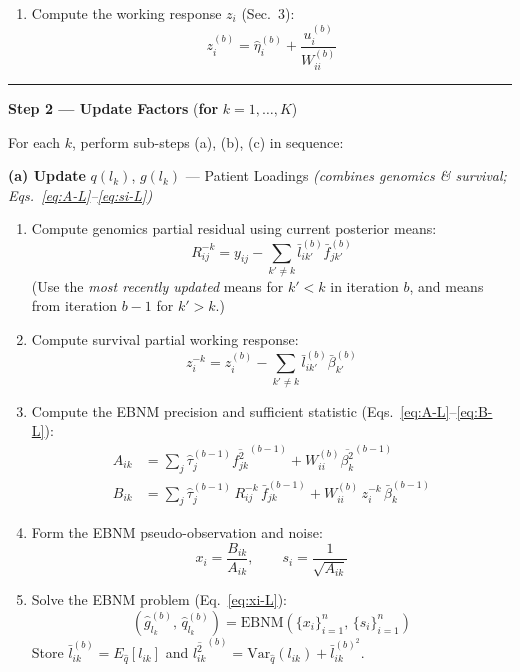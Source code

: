\documentclass{article}[12pt]
\newcommand{\lbar}[2]{\bar{l}_{#1#2}}
\newcommand{\fbar}[2]{\bar{f}_{#1#2}}
\newcommand{\bbar}[1]{\bar{\beta}_{#1}}
\newcommand{\lsec}[2]{\overline{l^{2}_{#1#2}}}
\newcommand{\fsec}[2]{\overline{f^{2}_{#1#2}}}
\newcommand{\bsec}[1]{\overline{\beta^{2}_{#1}}}
\begin{document}
\begin{tcolorbox}[
  breakable,
  colback=gray!4!white, colframe=black!70,
  title={\textbf{Algorithm 1.} Supervised MF --- CAVI Update Procedure},
  fonttitle=\bfseries, left=6pt, right=6pt, top=6pt, bottom=6pt
]
\begin{enumerate}[label=\textbf{1.\arabic*.}, leftmargin=2cm]
    \item Compute the working response $z_i$ (Sec.~3):
    \[
        z_i^{(b)} = \hat{\eta}_i^{(b)} + \frac{u_i^{(b)}}{W_{ii}^{(b)}}
    \]
\end{enumerate}

\medskip
\hrule
\medskip

\textbf{Step 2 --- Update Factors} \quad(\textbf{for} $k = 1, \ldots, K$)

\medskip
\noindent
For each $k$, perform sub-steps (a), (b), (c) in sequence:

\medskip
\textbf{(a) Update} $q(l_k)$, $g(l_k)$ --- Patient Loadings
\quad\emph{(combines genomics \& survival; Eqs.~\ref{eq:A-L}--\ref{eq:si-L})}

\begin{enumerate}[label=\textbf{a.\arabic*.}, leftmargin=2cm]
    \item Compute genomics partial residual using current posterior means:
    \[
        R^{-k}_{ij} = y_{ij} - \sum_{k'\neq k}\lbar{i}{k'}^{(b)}\fbar{j}{k'}^{(b)}
    \]
    (Use the \emph{most recently updated} means for $k'<k$ in iteration $b$,
    and means from iteration $b-1$ for $k'>k$.)

    \item Compute survival partial working response:
    \[
        z^{-k}_i = z_i^{(b)} - \sum_{k'\neq k}\lbar{i}{k'}^{(b)}\bbar{k'}^{(b)}
    \]

    \item Compute the EBNM precision and sufficient statistic
    (Eqs.~\ref{eq:A-L}--\ref{eq:B-L}):
    \begin{align*}
        A_{ik} &= \sum_j \hat{\tau}_j^{(b-1)}\fsec{j}{k}^{(b-1)}
                  + W_{ii}^{(b)}\bsec{k}^{(b-1)}\\
        B_{ik} &= \sum_j \hat{\tau}_j^{(b-1)}\,R^{-k}_{ij}\,\fbar{j}{k}^{(b-1)}
                  + W_{ii}^{(b)}\,z^{-k}_i\,\bbar{k}^{(b-1)}
    \end{align*}

    \item Form the EBNM pseudo-observation and noise:
    \[
        x_i = \frac{B_{ik}}{A_{ik}}, \qquad s_i = \frac{1}{\sqrt{A_{ik}}}
    \]

    \item Solve the EBNM problem (Eq.~\ref{eq:xi-L}):
    \[
        \left(\hat{g}_{l_k}^{(b)},\,\hat{q}_{l_k}^{(b)}\right)
        = \mathrm{EBNM}\!\left(\{x_i\}_{i=1}^n,\,\{s_i\}_{i=1}^n\right)
    \]
    Store $\lbar{i}{k}^{(b)} = E_{\hat{q}}[l_{ik}]$ and
    $\lsec{i}{k}^{(b)} = \mathrm{Var}_{\hat{q}}(l_{ik}) + \lbar{i}{k}^{(b)^2}$.
\end{enumerate}


\end{tcolorbox}
\end{document}
